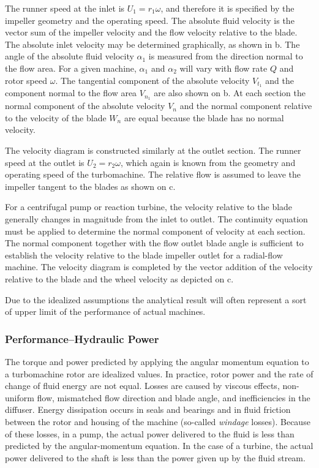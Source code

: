 The runner speed at the inlet is $U_1 = r_1 \omega$, and therefore it is specified by the impeller geometry and the operating speed.
The absolute fluid velocity is the vector sum of the impeller velocity and the flow velocity relative to the blade.
The absolute inlet velocity may be determined graphically, as shown in b.
The angle of the absolute fluid velocity $\alpha_1$ is measured from the direction normal to the flow area.
For a given machine, $\alpha_1$ and $\alpha_2$ will vary with flow rate $Q$ and rotor speed $\omega$.
The tangential component of the absolute velocity $V_{t_1}$ and the component normal to the flow area $V_{n_1}$ are also shown on b. 
At each section the normal component of the absolute velocity $V_n$ and the normal component relative to the velocity of the blade $W_n$ are equal because the blade has no normal velocity.

The velocity diagram is constructed similarly at the outlet section.
The runner speed at the outlet is $U_2 = r_2 \omega$, which again is known from the geometry and operating speed of the turbomachine.
The relative flow is assumed to leave the impeller tangent to the blades as shown on c.

For a centrifugal pump or reaction turbine, the velocity relative to the blade generally changes in magnitude from the inlet to outlet.
The continuity equation must be applied to determine the normal component of velocity at each section.
The normal component together with the flow outlet blade angle is sufficient to establish the velocity relative to the blade impeller outlet for a radial-flow machine.
The velocity diagram is completed by the vector addition of the velocity relative to the blade and the wheel velocity as depicted on c.

Due to the idealized assumptions the analytical result will often represent a sort of upper limit of the performance of actual machines.

\subsubsection{Performance--Hydraulic Power}
The torque and power predicted by applying the angular momentum equation to a turbomachine rotor are idealized values.
In practice, rotor power and the rate of change of fluid energy are not equal.
Losses are caused by viscous effects, non-uniform flow, mismatched flow direction and blade angle, and inefficiencies in the diffuser. 
Energy dissipation occurs in seals and bearings and in fluid friction between the rotor and housing of the machine (so-called \textit{windage} losses).
Because of these losses, in a pump, the actual power delivered to the fluid is less than predicted by the angular-momentum equation.
In the case of a turbine, the actual power delivered to the shaft is less than the power given up by the fluid stream.

